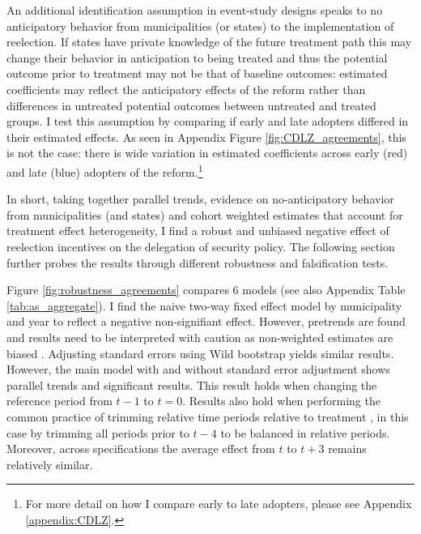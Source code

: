 \documentclass[12pt]{amsart}
\makeatletter
\def\subsection{\@startsection{subsection}{2}
	\z@{.8\linespacing\@plus.7\linespacing}{.7\linespacing}{\large}}
\numberwithin{equation}{section}
\theoremstyle{definition}
\theoremstyle{definition}
\theoremstyle{definition}
\makeatother
\begin{document}
An additional identification assumption in event-study designs speaks to no anticipatory behavior from municipalities (or states) to the implementation of reelection. If states have private knowledge of the future treatment path this may change their behavior in anticipation to being treated and thus the potential outcome prior to treatment may not be that of baseline outcomes: estimated coefficients may reflect the anticipatory effects of the reform rather than differences in untreated potential outcomes between untreated and treated groups. %
I test this assumption by comparing if early and late adopters differed in their estimated effects. As seen in Appendix Figure \ref{fig:CDLZ_agreements}, this is not the case: there is wide variation in estimated coefficients across early (red) and late (blue) adopters of the reform.\footnote{For more detail on how I compare early to late adopters, please see Appendix \ref{appendix:CDLZ}.}  

In short, taking together parallel trends, evidence on no-anticipatory behavior from municipalities (and states) and cohort weighted estimates that account for treatment effect heterogeneity, I find a robust and unbiased negative effect of reelection incentives on the delegation of security policy.  The following section further probes the results through different robustness and falsification tests.
         

\subsection{Robustness \label{sec:robustness}}
 
  Figure \ref{fig:robustness_agreements} compares 6 models (see also Appendix Table \ref{tab:as_aggregate}). I find the naive two-way fixed effect model by municipality and year to reflect a negative non-signifiant effect. However, pretrends are found and results need to be interpreted with caution as non-weighted estimates are biased \citep{abraham_sun_2020}. Adjusting standard errors using Wild bootstrap yields similar results. However, the main model with and without standard error adjustment shows parallel trends and significant results. This result holds when changing the reference period from $t-1$ to $t=0$. Results also hold when performing the common practice of trimming relative time periods relative to treatment \citep{borusyak_2017, dobkin_etal_2018}, in this case by trimming all periods prior to $t-4$ to be balanced in relative periods. Moreover, across specifications the average effect from $t$ to $t+3$ remains relatively similar. %
        
\end{document}
